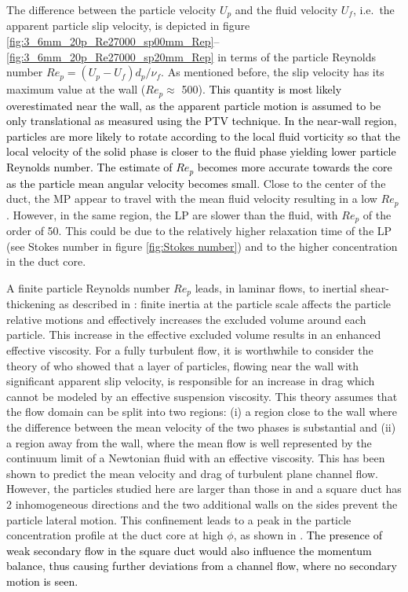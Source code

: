 \documentclass{jfm}
\def\sz#1{{\textcolor{black}{#1}}}
\begin{document}
The difference between the particle velocity $U_p$ and the fluid velocity $U_f$, i.e.\ the apparent particle slip velocity, is depicted in figure \ref{fig:3_6mm_20p_Re27000_sp00mm_Rep}--\ref{fig:3_6mm_20p_Re27000_sp20mm_Rep} in terms of the particle Reynolds number $Re_p=(U_p-U_f)d_p/\nu_f$. 
As mentioned before, the slip velocity has its maximum value at the wall  ($Re_p\approx$ 500). \sz{This quantity is most likely overestimated near the wall, as the apparent particle motion is assumed to be only translational as measured using the PTV technique. In the near-wall region, particles are more likely to rotate according to the local fluid vorticity so that the local velocity of the solid phase is closer to the fluid phase yielding lower particle Reynolds number. The estimate of $Re_p$ becomes more accurate towards the core as the particle mean angular velocity becomes small.} Close to the center of the duct, the MP appear to travel with the mean fluid velocity resulting in a low $Re_p$. However, in the same region, the LP are slower than the fluid, with $Re_p$ of the order of 50. 
This could be due to the relatively higher relaxation time of the LP (see Stokes number in figure \ref{fig:Stokes number}) and to the higher concentration in the duct core. 

A finite particle Reynolds number $Re_p$ 
leads, in laminar flows, to inertial shear-thickening as described in \citet{picano2013shear}: finite inertia at the particle scale affects the particle relative motions and effectively increases the excluded volume around each particle. This increase in the effective excluded volume results in an enhanced effective viscosity.
%
For a fully turbulent flow, it is worthwhile to consider the theory of \citet{costa2016universal} who showed that a layer of particles, flowing near the wall with significant apparent slip velocity, is responsible for an increase in drag which cannot be modeled by an effective suspension viscosity. 
This theory assumes that the flow domain can be split into two regions: (i) a region close to the wall where the difference between the mean velocity of the two phases is 
substantial and (ii) a region away from the wall, where the mean flow is well represented by the continuum limit of a Newtonian fluid with an effective viscosity. 
This has been shown to predict the mean velocity and drag of turbulent plane channel flow. 
However, the particles studied here are larger than those in \cite{costa2016universal}  and a square duct has 2 inhomogeneous directions
and the two additional walls on the sides prevent the particle lateral motion. This confinement leads to a peak in the particle concentration profile at the duct core at high $\phi$, as shown in \citet{fornari2017suspensions}. \sz{The presence of weak secondary flow in the square duct would also influence the momentum balance, thus causing further deviations from a channel flow, where no secondary motion is seen.}
\end{document}

